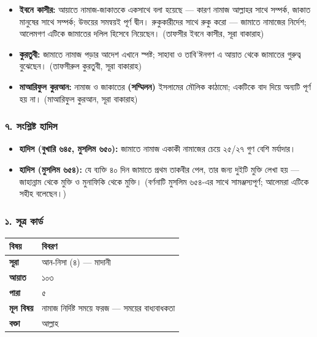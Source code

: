 \begin{itemize}
\item \textbf{ইবনে কাসীর:} আয়াতে নামাজ-জাকাতকে একসাথে বলা হয়েছে — কারণ নামাজ আল্লাহর সাথে সম্পর্ক, জাকাত মানুষের সাথে সম্পর্ক; উভয়ের সমন্বয়ই পূর্ণ দ্বীন। রুকুকারীদের সাথে রুকু করো — জামাতে নামাজের নির্দেশ; আলেমগণ এটিকে জামাতের দলিল হিসেবে নিয়েছেন। (তাফসীর ইবনে কাসীর, সূরা বাকারাহ)
\item \textbf{কুরতুবী:} জামাতে নামাজ পড়ার আদেশ এখানে স্পষ্ট; সাহাবা ও তাবি'ঈনগণ এ আয়াত থেকে জামাতের গুরুত্ব বুঝেছেন। (তাফসীরুল কুরতুবী, সূরা বাকারাহ)
\item \textbf{মাআরিফুল কুরআন:} নামাজ ও জাকাতের \textbf{ (সম্মিলন)} ইসলামের মৌলিক কাঠামো; একটিকে বাদ দিয়ে অন্যটি পূর্ণ হয় না। (মাআরিফুল কুরআন, সূরা বাকারাহ)
\end{itemize}
\subsubsection*{৭. সংশ্লিষ্ট হাদিস}

\begin{itemize}
\item \textbf{হাদিস (বুখারি ৬৪৫, মুসলিম ৬৫০):} জামাতে নামাজ একাকী নামাজের চেয়ে ২৫/২৭ গুণ বেশি মর্যাদার।
\item \textbf{হাদিস (মুসলিম ৬৫৪):} যে ব্যক্তি ৪০ দিন জামাতে প্রথম তাকবীর পেল, তার জন্য দুইটি মুক্তি লেখা হয় — জাহান্নাম থেকে মুক্তি ও মুনাফিকি থেকে মুক্তি। (বর্ণনাটি মুসলিম ৬৫৪-এর সাথে সামঞ্জস্যপূর্ণ; আলেমরা এটিকে সহীহ বলেছেন।)
\end{itemize}
\subsubsection*{১. সূত্র কার্ড}

\begin{table}[h]\centering\small
\begin{tabular}{ll}
বিষয় & বিবরণ \\
\hline
\textbf{সূরা} & আন-নিসা (৪) — মাদানী \\
\textbf{আয়াত} & ১০৩ \\
\textbf{পারা} & ৫ \\
\textbf{মূল বিষয়} & নামাজ নির্দিষ্ট সময়ে ফরজ — সময়ের বাধ্যবাধকতা \\
\textbf{বক্তা} & আল্লাহ \\
\hline
\end{tabular}
\end{table}

